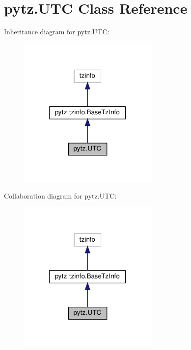 \hypertarget{classpytz_1_1UTC}{}\section{pytz.\+U\+TC Class Reference}
\label{classpytz_1_1UTC}


Inheritance diagram for pytz.\+U\+TC\+:
\nopagebreak
\begin{figure}[H]
\begin{center}
\leavevmode
\includegraphics[width=196pt]{classpytz_1_1UTC__inherit__graph}
\end{center}
\end{figure}


Collaboration diagram for pytz.\+U\+TC\+:
\nopagebreak
\begin{figure}[H]
\begin{center}
\leavevmode
\includegraphics[width=196pt]{classpytz_1_1UTC__coll__graph}
\end{center}
\end{figure}
